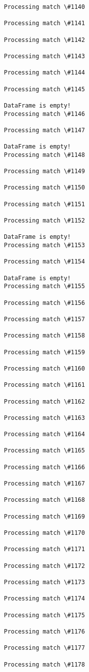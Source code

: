 \documentclass[11pt]{article}
\begin{document}
\begin{Verbatim}[commandchars=\\\{\}]
Processing match \#1140

Processing match \#1141

Processing match \#1142

Processing match \#1143

Processing match \#1144

Processing match \#1145

DataFrame is empty!
Processing match \#1146

Processing match \#1147

DataFrame is empty!
Processing match \#1148

Processing match \#1149

Processing match \#1150

Processing match \#1151

Processing match \#1152

DataFrame is empty!
Processing match \#1153

Processing match \#1154

DataFrame is empty!
Processing match \#1155

Processing match \#1156

Processing match \#1157

Processing match \#1158

Processing match \#1159

Processing match \#1160

Processing match \#1161

Processing match \#1162

Processing match \#1163

Processing match \#1164

Processing match \#1165

Processing match \#1166

Processing match \#1167

Processing match \#1168

Processing match \#1169

Processing match \#1170

Processing match \#1171

Processing match \#1172

Processing match \#1173

Processing match \#1174

Processing match \#1175

Processing match \#1176

Processing match \#1177

Processing match \#1178


\end{Verbatim}
\end{document}
